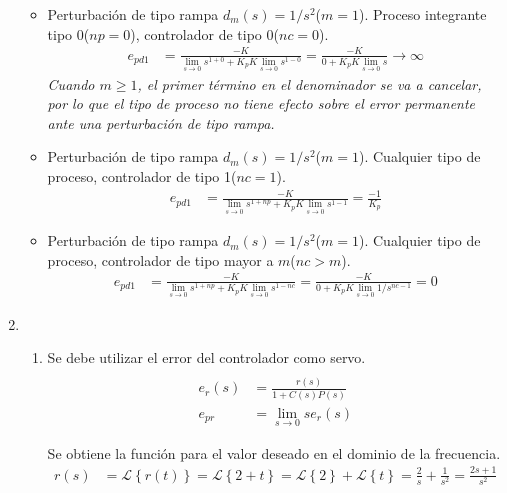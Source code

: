\begin{ejercicio}
\begin{enumerate}
\begin{itemize}
      \item
      Perturbación de tipo rampa $d_m(s)=1/s^2$($m=1$). Proceso integrante tipo 0($np=0$), controlador de tipo 0($nc=0$).
      \begin{align*}
        e_{pd1} &= \frac{-K}
        {\lim_{s\rightarrow 0}s^{1+0} + K_p K\lim_{s\rightarrow 0} s^{1-0}}
        =
        \frac{-K}
        {0 + K_p K\lim_{s\rightarrow 0} s} \rightarrow \infty
      \end{align*}
      \textit{Cuando $m\geq 1$, el primer término en el denominador se va a cancelar, por lo que el tipo de proceso no tiene efecto sobre el error permanente ante una perturbación de tipo rampa.}

      \item
      Perturbación de tipo rampa $d_m(s)=1/s^2$($m=1$). Cualquier tipo de proceso, controlador de tipo 1($nc=1$).
      \begin{align*}
        e_{pd1} &= \frac{-K}
        {\lim_{s\rightarrow 0}s^{1+np} + K_p K\lim_{s\rightarrow 0} s^{1-1}}
        =
        \frac{-1}{K_p}
      \end{align*}

          \item
      Perturbación de tipo rampa $d_m(s)=1/s^2$($m=1$). Cualquier tipo de proceso, controlador de tipo mayor a $m$($nc>m$).
      \begin{align*}
        e_{pd1} &= \frac{-K}
        {\lim_{s\rightarrow 0}s^{1+np} + K_p K\lim_{s\rightarrow 0} s^{1-nc}}
        =
        \frac{-K}
        {0 + K_p K\lim_{s\rightarrow 0} 1/s^{nc-1}} = 0
      \end{align*}

    \end{itemize}

    \item
    \begin{enumerate}
      \item 
      Se debe utilizar el error del controlador como servo.
      \begin{align*}
        \\ \tag{Error de control como servo}
        e_r(s) &= \frac{r(s)}{1+C(s)P(s)}
        \\ \tag{Teorema del valor final}
        e_{pr} &= \lim_{s\rightarrow 0} s e_r(s)
      \end{align*}

      Se obtiene la función para el valor deseado en el dominio de la frecuencia.
      \begin{align*}
        r(s) &= \mathcal{L} \left\{r(t)\right\} = \mathcal{L} \left\{2+t\right\} = \mathcal{L} \left\{2\right\} + \mathcal{L} \left\{t\right\} = \frac{2}{s} + \frac{1}{s^2} = \frac{2s + 1}{s^2}
      \end{align*}


\end{enumerate}
\end{enumerate}
\end{ejercicio}
